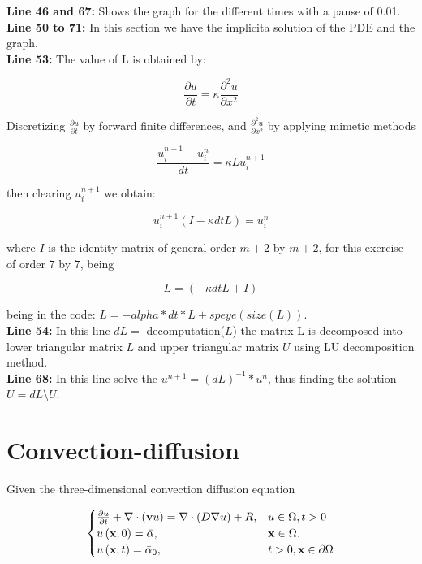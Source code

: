 \textbf{Line 46 and 67:} Shows the graph for the different times with a pause of 0.01. \\


\textbf{Line 50 to 71:} In this section we have the implicita solution of the PDE and the graph. \\

\textbf{Line 53:} The value of L is obtained by:

\begin{equation}
    \frac{\partial u}{\partial t} = \kappa \frac{\partial^{2} u}{\partial x^{2}}
\end{equation}

Discretizing $\frac{\partial u}{\partial t}$ by forward finite differences, and $\frac{\partial^{2} u}{\partial x^{2}}$ by applying mimetic methods

\begin{equation}
    \frac{u^{n+1}_{i} - u^{n}_{i} }{dt} = \kappa L 	u^{n+1}_{i}
\end{equation}

then clearing $u^{n+1}_{i}$ we obtain:


\begin{equation}
    u^{n+1}_{i}(I - \kappa dt L ) = u^{n}_{i}
\end{equation}

where $I$ is the identity matrix of general order $m+2$ by $m+2$, for this exercise of order $7$ by $7$, being

$$  L = (-\kappa dt L + I)$$

being in the code: $ L = -alpha*dt*L +speye(size(L))$.\\

\textbf{Line 54:} In this line $dL=$ decomputation($L$) the matrix L is decomposed into lower triangular matrix $L$ and upper triangular matrix $U$ using LU decomposition method.\\

\textbf{Line 68:} In this line solve the $u^{n+1} =(dL)^{-1}*u^{n}$, thus finding the solution $U=dL \setminus U$.\\



\section{Convection-diffusion}
Given the three-dimensional convection diffusion equation

\begin{equation}\label{eq:IBVP3d}
    \begin{cases}
        \diffp{u}{t} + \nabla \cdot (\textbf{v} u) = \nabla \cdot (D \nabla u) + R,
                                      & u \in \Omega, t > 0     \\
        u\left( \textbf{x},0\right)= \bar{\alpha},
                                      & \textbf{x} \in  \Omega.\\
        u\left(\textbf{x},t\right)= \bar{\alpha}_{0}, & t >0, \textbf{x} \in \partial  \Omega  
    \end{cases}
\end{equation}

